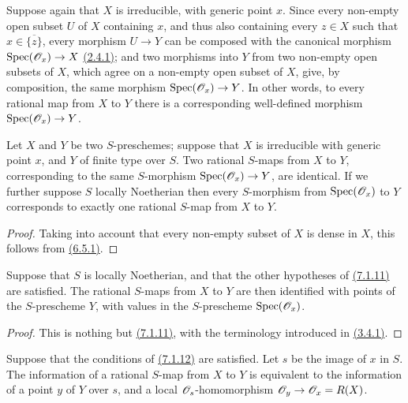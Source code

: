 \begin{env}[7.1.10]
\label{1.7.1.10}
Suppose again that $X$ is irreducible, with generic point $x$.
Since every non-empty open subset $U$ of $X$ containing $x$, and thus also containing every $z\in X$ such that $x\in\overline{\{z\}}$, every morphism $U\to Y$ can be composed with the canonical morphism ${\mathop{\mathrm{Spec}}\nolimits}(\mathscr{O}_x)\to X$ \hyperref[1.2.4.1]{(2.4.1)}; and two morphisms into $Y$ from two non-empty open subsets of $X$, which agree on a non-empty open subset of $X$, give, by composition, the same morphism ${\mathop{\mathrm{Spec}}\nolimits}(\mathscr{O}_x)\to Y$.
In other words, to every rational map from $X$ to $Y$ there is a corresponding well-defined morphism ${\mathop{\mathrm{Spec}}\nolimits}(\mathscr{O}_x)\to Y$.
\end{env}

\begin{prop}[7.1.11]
\label{1.7.1.11}
Let $X$ and $Y$ be two $S$-preschemes; suppose that $X$ is irreducible with generic point $x$, and $Y$ of finite type over $S$.
Two rational $S$-maps from $X$ to $Y$, corresponding to the same $S$-morphism ${\mathop{\mathrm{Spec}}\nolimits}(\mathscr{O}_x)\to Y$, are identical.
If we further suppose $S$ locally Noetherian then every $S$-morphism from ${\mathop{\mathrm{Spec}}\nolimits}(\mathscr{O}_x)$ to $Y$ corresponds to exactly one rational $S$-map from $X$ to $Y$.
\end{prop}

\begin{proof}
\label{proof-1.7.1.11}
Taking into account that every non-empty subset of $X$ is dense in $X$, this follows from \hyperref[1.6.5.1]{(6.5.1)}.
\end{proof}

\begin{cor}[7.1.12]
\label{1.7.1.12}
Suppose that $S$ is locally Noetherian, and that the other hypotheses of \hyperref[1.7.1.11]{(7.1.11)} are satisfied.
The rational $S$-maps from $X$ to $Y$ are then identified with points of the $S$-prescheme $Y$, with values in the $S$-prescheme ${\mathop{\mathrm{Spec}}\nolimits}(\mathscr{O}_x)$.
\end{cor}

\begin{proof}
\label{proof-1.7.1.12}
This is nothing but \hyperref[1.7.1.11]{(7.1.11)}, with the terminology introduced in \hyperref[1.3.4.1]{(3.4.1)}.
\end{proof}

\begin{cor}[7.1.13]
\label{1.7.1.13}
Suppose that the conditions of \hyperref[1.7.1.12]{(7.1.12)} are satisfied.
Let $s$ be the image of $x$ in $S$.
The information of a rational $S$-map from $X$ to $Y$ is equivalent to the information of a point $y$ of $Y$ over $s$, and a local $\mathscr{O}_s$-homomorphism $\mathscr{O}_y\to\mathscr{O}_x=R(X)$.
\end{cor}

